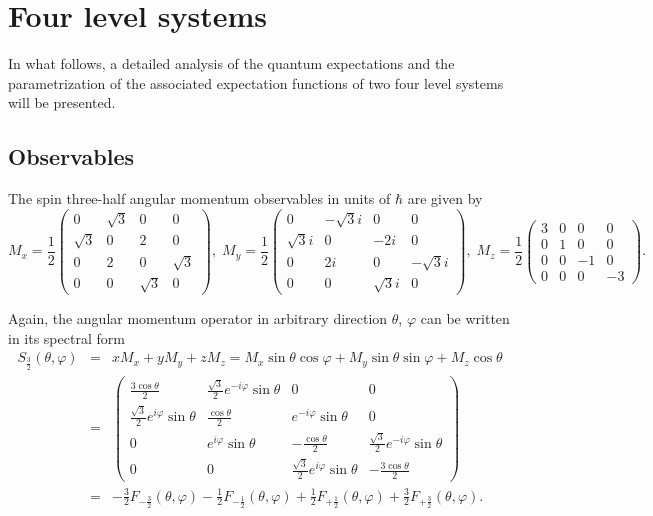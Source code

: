 \documentclass[pra,amsfonts,showpacs,showkeys,preprint]{revtex4}
\begin{document}
\section{Four level systems}

In what follows, a detailed analysis of the quantum expectations and the parametrization of the associated expectation functions
of two four level systems will be presented.

\subsection{Observables}
The spin three-half angular momentum observables in units of $\hbar$ are given by~\cite{schiff-55}
\begin{equation}
M_x=
\frac{1}{2}
\left(
\begin{array}{cccccccccc}
0&\sqrt{3}&0&0\\
\sqrt{3}&0&2&0\\
0&2&0&\sqrt{3}\\
0&0&\sqrt{3}&0
\end{array}
\right),
\;
M_y=
\frac{1}{2}
\left(
\begin{array}{ccccccccccr}
0&-\sqrt{3}i&0&0\\
\sqrt{3}i&0&-2i&0\\
0&2i&0&-\sqrt{3}i\\
0&0&\sqrt{3}i&0
\end{array}
\right),
\;
M_z=
\frac{1}{2}
\left(
\begin{array}{cccccccccc}
3&0&0&0\\
0&1&0&0\\
0&0&-1&0\\
0&0&0&-3
\end{array}
\right).
\end{equation}

Again, the angular momentum operator in arbitrary direction $\theta$, $\varphi$ can be written in its spectral form
\begin{equation}
\begin{array}{rcl}
S_\frac{3}{2} (\theta ,\varphi) &=&
xM_x
+
yM_y
+
zM_z
=
 M_x  \sin \theta \cos \varphi
+
M_y   \sin \theta \sin \varphi
+
M_z   \cos \theta
\\
&=&   \left(
\begin{array}{cccc}
 \frac{3 \cos \theta }{2} & \frac{\sqrt{3}}{2}  e^{-i \varphi } \sin \theta  & 0 & 0 \\
 \frac{\sqrt{3}}{2}  e^{i \varphi } \sin \theta  & \frac{\cos \theta }{2} & e^{-i \varphi } \sin \theta  & 0 \\
 0 & e^{i \varphi } \sin \theta  & -\frac{\cos \theta }{2} & \frac{\sqrt{3}}{2}  e^{-i \varphi } \sin \theta  \\
 0 & 0 & \frac{ \sqrt{3}}{2} e^{i \varphi } \sin \theta  & -\frac{3 \cos \theta }{2}
\end{array}
\right)  \\
&=& -\frac{3}{2}F_{-\frac{3}{2}}(\theta ,\varphi) - \frac{1}{2} F_{-\frac{1}{2}}(\theta ,\varphi) +
\frac{1}{2}F_{+\frac{1}{2}}(\theta ,\varphi)+ \frac{3}{2}F_{+\frac{3}{2}}(\theta ,\varphi).
\end{array}
\label{e-2009-gtq-s444}
\end{equation}
\end{document}
